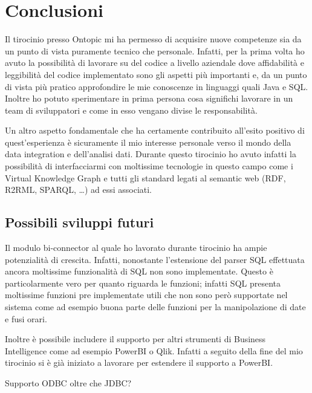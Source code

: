 \chapter{Conclusioni}
\label{cha:conclusions}
Il tirocinio presso Ontopic mi ha permesso di acquisire nuove competenze sia da un punto di vista puramente tecnico che 
personale. Infatti, per la prima volta ho avuto la possibilità di lavorare su del codice a livello aziendale dove 
affidabilità e leggibilità del codice implementato sono gli aspetti più importanti e, da un punto di vista più
pratico approfondire le mie conoscenze in linguaggi quali Java e SQL. Inoltre ho potuto sperimentare in prima persona cosa significhi lavorare in un team di sviluppatori e come in esso 
vengano divise le responsabilità.

Un altro aspetto fondamentale che ha certamente contribuito all'esito positivo di quest'esperienza è sicuramente il 
mio interesse personale verso il mondo della data integration e dell'analisi dati. Durante questo 
tirocinio ho avuto infatti la possibilità di interfacciarmi con moltissime tecnologie in questo campo come i Virtual Knowledge
Graph e tutti gli standard legati al semantic web (RDF, R2RML, SPARQL, \dots) ad essi associati.

\section{Possibili sviluppi futuri}
\label{sec:conclusions_future}
Il modulo bi-connector al quale ho lavorato durante tirocinio ha ampie potenzialità di crescita. Infatti, nonostante l'estensione
del parser SQL effettuata ancora moltissime funzionalità di SQL non sono implementate. Questo è particolarmente vero per quanto 
riguarda le funzioni; infatti SQL presenta moltissime funzioni pre implementate utili che non sono però supportate nel sistema
come ad esempio buona parte delle funzioni per la manipolazione di date e fusi orari.

Inoltre è possibile includere il supporto per altri strumenti di Business Intelligence come ad esempio PowerBI o Qlik. Infatti 
a seguito della fine del mio tirocinio si è già iniziato a lavorare per estendere il supporto a PowerBI.

Supporto ODBC oltre che JDBC?

